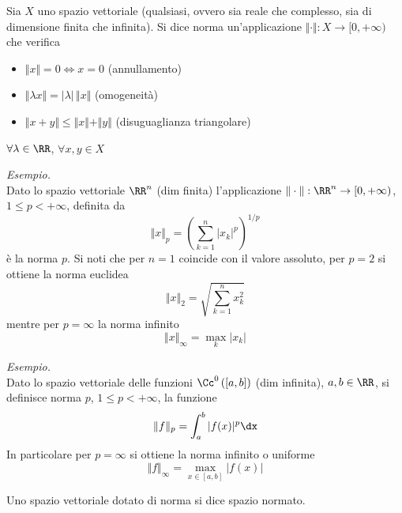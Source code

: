 \begin{defn}
[Norma]
Sia $X$ uno spazio vettoriale (qualsiasi, ovvero sia reale che complesso, sia di dimensione finita che infinita). Si dice norma un'applicazione $ \Vert \cdot \Vert : X\rightarrow [0, + \infty)$ che verifica
\begin{itemize}
\item $ \Vert x \Vert = 0\iff x = 0$ (annullamento)
\item $ \Vert \lambda x \Vert = | \lambda |\, \Vert x \Vert $ (omogeneità)
\item $ \Vert x + y \Vert \leq \Vert x \Vert + \Vert y \Vert $ (disuguaglianza triangolare)
\end{itemize}
$\forall \lambda \in \RR$, $\forall x, y\in X$
\end{defn}

\textit{Esempio.}\\
Dato lo spazio vettoriale $\RR^n$ (dim finita) l'applicazione $ \Vert \cdot \Vert : \RR^{n}\rightarrow [0, + \infty)$, $1 \leq p < + \infty $, definita da
\begin{equation*}
\Vert x \Vert_{p} = \left(\sum_{k=1}^n|x_k|^p\right)^{1/p}
\end{equation*}
è la norma $p$. Si noti che per $n=1$ coincide con il valore assoluto, per $p=2$ si ottiene la norma euclidea
\begin{equation*}
\Vert x \Vert_{2} = \sqrt{\sum_{k=1}^n x_k^2}
\end{equation*}
mentre per $p=\infty$ la norma infinito
\begin{equation*}
\Vert x \Vert_{\infty} = \max_k |x_k|
\end{equation*}

\textit{Esempio.}\\
Dato lo spazio vettoriale delle funzioni $\Cc^0\left([a,b]\right)$ (dim infinita), $a,b\in\RR$, si definisce norma $p$, $1 \leq p < + \infty $, la funzione
\begin{equation*}
\Vert f \Vert_{p}=\int_a^b |f(x)|^p \dx
\end{equation*}
In particolare per $p=\infty$ si ottiene la norma infinito o uniforme
\begin{equation*}
\Vert f \Vert_{\infty}=\max_{x\in[a,b]}|f(x)|
\end{equation*}

\begin{defn}
Uno spazio vettoriale dotato di norma si dice spazio normato.
\end{defn}

